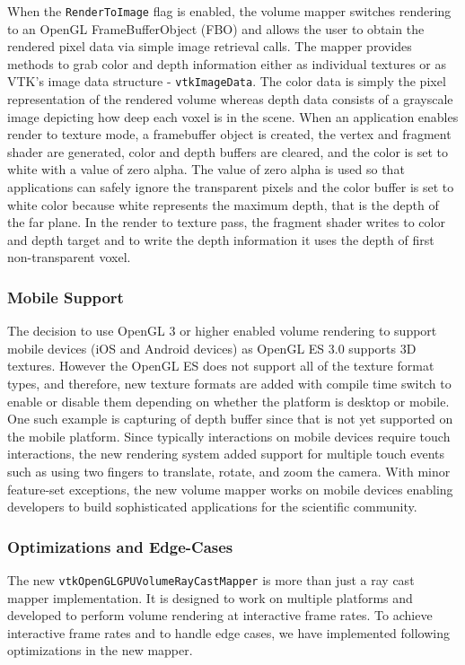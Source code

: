 When the \texttt{RenderToImage} flag is enabled, the volume mapper switches
rendering to an OpenGL FrameBufferObject (FBO) and allows the user to obtain the
rendered pixel data via simple image retrieval calls. The mapper provides
methods to grab color and depth information either as individual textures or as
VTK's image data structure - \texttt{vtkImageData}. The color data is simply the
pixel representation of the rendered volume whereas depth data consists of a
grayscale image depicting how deep each voxel is in the scene. When an
application enables render to texture mode, a framebuffer object is created, the
vertex and fragment shader are generated, color and depth buffers are cleared,
and the color is set to white with a value of zero alpha. The value of zero
alpha is used so that applications can safely ignore the transparent pixels and
the color buffer is set to white color because white represents the maximum
depth, that is the depth of the far plane. In the render to texture pass, the
fragment shader writes to color and depth target and to write the depth
information it uses the depth of first non-transparent voxel.

\subsubsection{Mobile Support}
The decision to use OpenGL 3 or higher enabled volume rendering to support mobile devices (iOS and Android devices) as OpenGL ES 3.0 supports 3D textures. However the OpenGL ES does not support all of the texture format types, and therefore, new texture formats are added with compile time switch to enable or disable them depending on whether the platform is desktop or mobile. One such example is capturing of depth buffer since that is not yet supported on the mobile platform.  Since typically interactions on mobile devices require touch interactions, the new rendering system added support for multiple touch events such as using two fingers to translate, rotate, and zoom the camera. With minor feature-set exceptions, the new volume mapper works on mobile devices enabling developers to build sophisticated applications for the scientific community.

\subsubsection{Optimizations and Edge-Cases}
The new \texttt{vtkOpenGLGPUVolumeRayCastMapper} is more than just a ray cast mapper implementation. It is designed to work on multiple platforms and developed to perform volume rendering at interactive frame rates. To achieve interactive frame rates and to handle edge cases, we have implemented following optimizations in the new mapper. 

